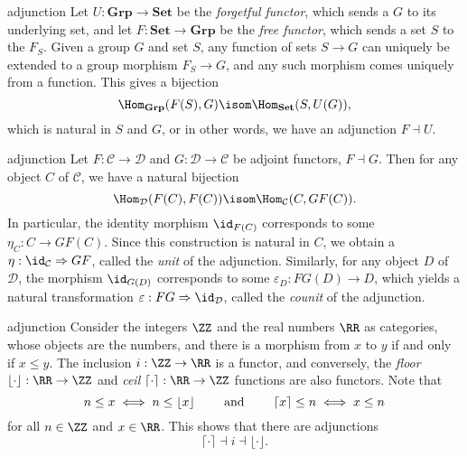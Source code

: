 \begin{example}{adjunction}
    Let $U : \textbf{Grp} \to \textbf{Set}$ be the \textit{forgetful functor}, which sends a  $G$ to its underlying set, and let $F : \textbf{Set} \to \textbf{Grp}$ be the \textit{free functor}, which sends a set $S$ to the  $F_S$. Given a group $G$ and set $S$, any function of sets $S \to G$ can uniquely be extended to a group morphism $F_S \to G$, and any such morphism comes uniquely from a function. This gives a bijection
    \[ \Hom_{\textbf{Grp}}(F(S), G) \isom \Hom_{\textbf{Set}}(S, U(G)) , \]
    which is natural in $S$ and $G$, or in other words, we have an adjunction $F \dashv U$.
\end{example}

\begin{example}{adjunction}
    Let $F : \mathcal{C} \to \mathcal{D}$ and $G : \mathcal{D} \to \mathcal{C}$ be adjoint functors, $F \dashv G$. Then for any object $C$ of $\mathcal{C}$, we have a natural bijection
    \[ \Hom_{\mathcal{D}}(F(C), F(C)) \isom \Hom_{\mathcal{C}}(C, GF(C)) . \]
    In particular, the identity morphism $\id_{F(C)}$ corresponds to some $\eta_C : C \to GF(C)$. Since this construction is natural in $C$, we obtain a  $\eta : \id_\mathcal{C} \Rightarrow GF$, called the \textit{unit} of the adjunction.
    Similarly, for any object $D$ of $\mathcal{D}$, the morphism $\id_{G(D)}$ corresponds to some $\varepsilon_D : FG(D) \to D$, which yields a natural transformation $\varepsilon : FG \Rightarrow \id_\mathcal{D}$, called the \textit{counit} of the adjunction.
\end{example}

\begin{example}{adjunction}
    Consider the integers $\ZZ$ and the real numbers $\RR$ as categories, whose objects are the numbers, and there is a morphism from $x$ to $y$ if and only if $x \le y$. The inclusion $i : \ZZ \to \RR$ is a functor, and conversely, the \textit{floor} $\lfloor \cdot \rfloor : \RR \to \ZZ$ and \textit{ceil} $\lceil \cdot \rceil : \RR \to \ZZ$ functions are also functors. Note that
    \[ n \le x \iff n \le \lfloor x \rfloor \qquad \textup{ and } \qquad \lceil x \rceil \le n \iff x \le n \]
    for all $n \in \ZZ$ and $x \in \RR$. This shows that there are adjunctions
    \[ \lceil \cdot \rceil \dashv i \dashv \lfloor \cdot \rfloor . \]
\end{example}

